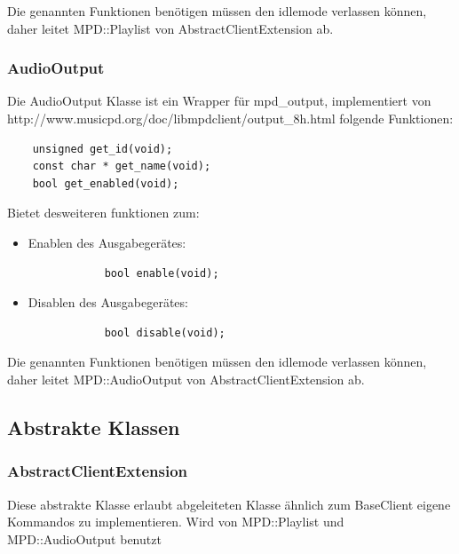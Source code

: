 Die genannten Funktionen benötigen müssen den idlemode verlassen können,
daher leitet MPD::Playlist von AbstractClientExtension ab.

\subsubsection{AudioOutput}
Die AudioOutput Klasse ist ein Wrapper für mpd\_output, implementiert von http://www.musicpd.org/doc/libmpdclient/output\_8h.html folgende Funktionen:
\begin{verbatim}
    unsigned get_id(void);
    const char * get_name(void);
    bool get_enabled(void);
\end{verbatim}

Bietet desweiteren funktionen zum:
\begin{itemize}
    \item Enablen des Ausgabegerätes:
        \begin{verbatim}
            bool enable(void);
        \end{verbatim}
    \item Disablen des Ausgabegerätes:
        \begin{verbatim}
            bool disable(void);
        \end{verbatim}
\end{itemize}


Die genannten Funktionen benötigen müssen den idlemode verlassen können,
daher leitet MPD::AudioOutput von AbstractClientExtension ab. 
\newpage
\subsection{Abstrakte Klassen}
\subsubsection{AbstractClientExtension}
Diese abstrakte Klasse erlaubt abgeleiteten Klasse ähnlich zum BaseClient eigene Kommandos zu implementieren.
Wird von MPD::Playlist und MPD::AudioOutput benutzt 

